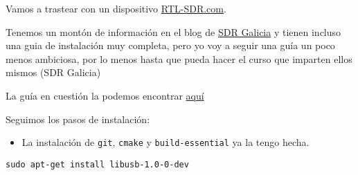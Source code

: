 \documentclass[
  12pt,
  spanish,
]{article}
\providecommand{\tightlist}{%
  \setlength{\itemsep}{0pt}\setlength{\parskip}{0pt}}
\begin{document}
Vamos a trastear con un dispositivo
\href{https://www.rtl-sdr.com/}{RTL-SDR.com}.

Tenemos un montón de información en el blog de
\href{https://sdrgal.wordpress.com/}{SDR Galicia} y tienen incluso una
guia de instalación muy completa, pero yo voy a seguir una guía un poco
menos ambiciosa, por lo menos hasta que pueda hacer el curso que
imparten ellos mismos (SDR Galicia)

La guía en cuestión la podemos encontrar
\href{https://ranous.wordpress.com/rtl-sdr4linux/}{aquí}

Seguimos los pasos de instalación:

\begin{itemize}
\tightlist
\item
  La instalación de \texttt{git}, \texttt{cmake} y
  \texttt{build-essential} ya la tengo hecha.
\end{itemize}

\begin{verbatim}
sudo apt-get install libusb-1.0-0-dev
\end{verbatim}
\end{document}
